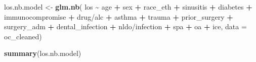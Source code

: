 \documentclass[
]{article}
\newenvironment{Shaded}{\begin{snugshade}}{\end{snugshade}}
\newcommand{\AttributeTok}[1]{\textcolor[rgb]{0.13,0.29,0.53}{#1}}
\newcommand{\FunctionTok}[1]{\textcolor[rgb]{0.13,0.29,0.53}{\textbf{#1}}}
\newcommand{\NormalTok}[1]{#1}
\newcommand{\OtherTok}[1]{\textcolor[rgb]{0.56,0.35,0.01}{#1}}
\newcommand{\SpecialCharTok}[1]{\textcolor[rgb]{0.81,0.36,0.00}{\textbf{#1}}}
\newcommand{\StringTok}[1]{\textcolor[rgb]{0.31,0.60,0.02}{#1}}
\begin{document}
\begin{Shaded}
\begin{Highlighting}[]
\NormalTok{los.nb.model }\OtherTok{\textless{}{-}} \FunctionTok{glm.nb}\NormalTok{(}
\NormalTok{  los }\SpecialCharTok{\textasciitilde{}}\NormalTok{ age }\SpecialCharTok{+}\NormalTok{ sex }\SpecialCharTok{+}\NormalTok{ race\_eth }\SpecialCharTok{+}
\NormalTok{    sinusitis }\SpecialCharTok{+}\NormalTok{ diabetes }\SpecialCharTok{+}\NormalTok{ immunocompromise }\SpecialCharTok{+} \StringTok{\textasciigrave{}}\AttributeTok{drug/alc}\StringTok{\textasciigrave{}} \SpecialCharTok{+}
\NormalTok{    asthma }\SpecialCharTok{+}\NormalTok{ trauma }\SpecialCharTok{+}\NormalTok{ prior\_surgery }\SpecialCharTok{+}\NormalTok{ surgery\_adm }\SpecialCharTok{+}\NormalTok{ dental\_infection }\SpecialCharTok{+}
    \StringTok{\textasciigrave{}}\AttributeTok{nldo/infection}\StringTok{\textasciigrave{}} \SpecialCharTok{+}\NormalTok{ spa }\SpecialCharTok{+}\NormalTok{ oa }\SpecialCharTok{+}\NormalTok{ ice,}
  \AttributeTok{data =}\NormalTok{ oc\_cleaned)}

\FunctionTok{summary}\NormalTok{(los.nb.model)}
\end{Highlighting}
\end{Shaded}
\end{document}
